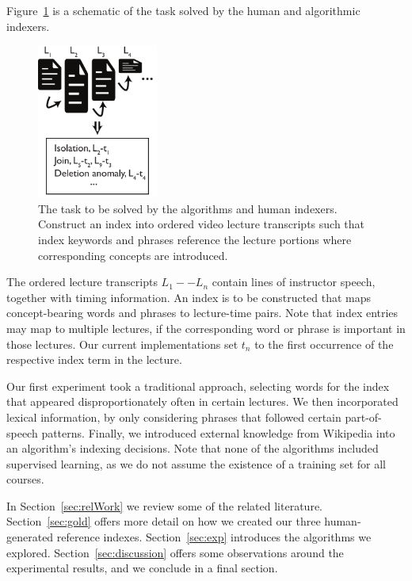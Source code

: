 Figure~\ref{fig:task} is a schematic of the task solved by the human
and algorithmic indexers.
\begin{figure}[htp]
       \centering
       \includegraphics[height=2in]{indexingTask.pdf}
       \caption{\textnormal{The task to be solved by the algorithms
           and human indexers. Construct an index into ordered video
           lecture transcripts such that index keywords and phrases
           reference the lecture portions where corresponding concepts
           are introduced.}}
       \label{fig:task}
\end{figure}

The ordered lecture transcripts $L_1--L_n$ contain lines of instructor
speech, together with timing information. An index is to be
constructed that maps concept-bearing words and phrases to
lecture-time pairs. Note that index entries may map to multiple
lectures, if the corresponding word or phrase is important in those
lectures. Our current implementations set $t_n$ to the first
occurrence of the respective index term in the lecture.

Our first experiment took a traditional approach, selecting words for
the index that appeared disproportionately often in certain
lectures. We then incorporated lexical information, by only
considering phrases that followed certain part-of-speech
patterns. Finally, we introduced external knowledge from Wikipedia
into an algorithm's indexing decisions. Note that none of the
algorithms included supervised learning, as we do not assume the
existence of a training set for all courses.

In Section~\ref{sec:relWork} we review some of the related
literature. Section~\ref{sec:gold} offers more detail on how we
created our three human-generated reference
indexes. Section~\ref{sec:exp} introduces the algorithms we
explored. Section~\ref{sec:discussion} offers some observations around
the experimental results, and we conclude in a final section.


